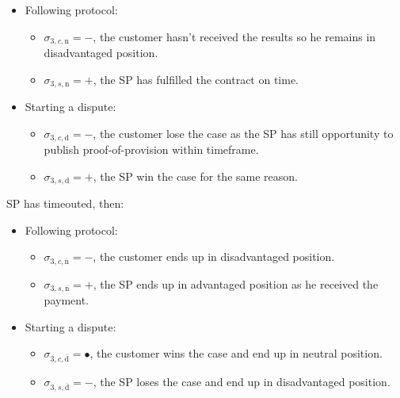 \documentclass{ieeeaccess}
\begin{document}
\begin{itemize}
\item
  Following protocol:

  \begin{itemize}
  
  \item
    \(\sigma_{3, c, \mathrm{n}} = -\), the customer hasn't received the
    results so he remains in disadvantaged position.
  \item
    \(\sigma_{3, s, \mathrm{n}} = +\), the SP has fulfilled the contract
    on time.
  \end{itemize}
\item
  Starting a dispute:

  \begin{itemize}
  
  \item
    \(\sigma_{3, c, \mathrm{d}} = -\), the customer lose the case as the
    SP has still opportunity to publish proof-of-provision within
    timeframe.
  \item
    \(\sigma_{3, s, \mathrm{d}} = +\), the SP win the case for the same
    reason.
  \end{itemize}
\end{itemize}

SP has timeouted, then:

\begin{itemize}
\item
  Following protocol:

  \begin{itemize}
  
  \item
    \(\sigma_{3, c, \overline{\mathrm{n}}} = -\), the customer ends up in disadvantaged position.
  \item
    \(\sigma_{3, s, \overline{\mathrm{n}}} = +\), the SP ends up in
    advantaged position as he received the payment.
  \end{itemize}
\item
  Starting a dispute:

  \begin{itemize}
  
  \item
    \(\sigma_{3, c, \overline{\mathrm{d}}} = •\), the customer wins the case and end up in neutral position.
  \item
    \(\sigma_{3, s, \overline{\mathrm{d}}} = -\), the SP loses the case
    and end up in disadvantaged position.
  \end{itemize}
\end{itemize}
\end{document}
